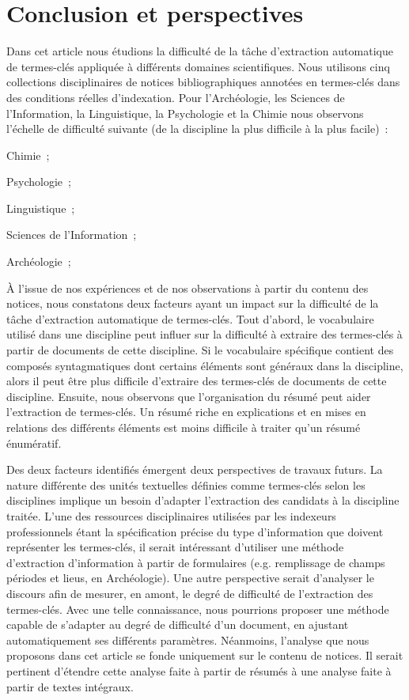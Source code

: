 \section{Conclusion et perspectives}
\label{sec:conclusion_et_perspectives}
  Dans cet article nous étudions la difficulté de la tâche d'extraction
  automatique de termes-clés appliquée à différents domaines scientifiques. Nous
  utilisons cinq collections disciplinaires de notices bibliographiques annotées
  en termes-clés dans des conditions réelles d'indexation. Pour l'Archéologie,
  les Sciences de l'Information, la Linguistique, la Psychologie et la Chimie
  nous observons l'échelle de difficulté suivante (de la discipline la plus
  difficile à la plus facile)~:
  \begin{enumerate*}
    \item{Chimie~;}
    \item{Psychologie~;}
    \item{Linguistique~;}
    \item{Sciences de l'Information~;}
    \item{Archéologie~;}
  \end{enumerate*}

  À l'issue de nos expériences et de nos observations à partir du contenu des
  notices, nous constatons deux facteurs ayant un impact sur la difficulté de la
  tâche d'extraction automatique de termes-clés. Tout d'abord, le vocabulaire
  utilisé dans une discipline peut influer sur la difficulté à extraire des
  termes-clés à partir de documents de cette discipline. Si le vocabulaire
  spécifique contient des composés syntagmatiques dont certains éléments sont
  généraux dans la discipline, alors il peut être plus difficile
  d'extraire des termes-clés de documents de cette discipline. Ensuite, nous
  observons que l'organisation du résumé peut aider l'extraction de termes-clés.
  Un résumé riche en explications et en mises en relations des différents
  éléments est moins difficile à traiter qu'un résumé énumératif.

  Des deux facteurs identifiés émergent deux perspectives de travaux futurs.
  La nature différente des unités textuelles définies comme termes-clés selon
  les disciplines implique un besoin d'adapter l'extraction des candidats à la
  discipline traitée. L'une des ressources disciplinaires utilisées par les
  indexeurs professionnels étant la spécification précise du type d'information
  que doivent représenter les termes-clés, il serait intéressant d'utiliser une
  méthode d'extraction d'information à partir de formulaires (e.g. remplissage
  de champs périodes et lieus, en Archéologie). Une autre perspective serait
  d'analyser le discours afin de mesurer, en amont, le degré de difficulté de
  l'extraction des termes-clés. Avec une telle connaissance, nous pourrions
  proposer une méthode capable de s'adapter au degré de difficulté d'un
  document, en ajustant automatiquement ses différents paramètres. Néanmoins,
  l'analyse que nous proposons dans cet article se fonde uniquement sur le
  contenu de notices. Il serait pertinent d'étendre cette analyse faite à partir
  de résumés à une analyse faite à partir de textes intégraux.

